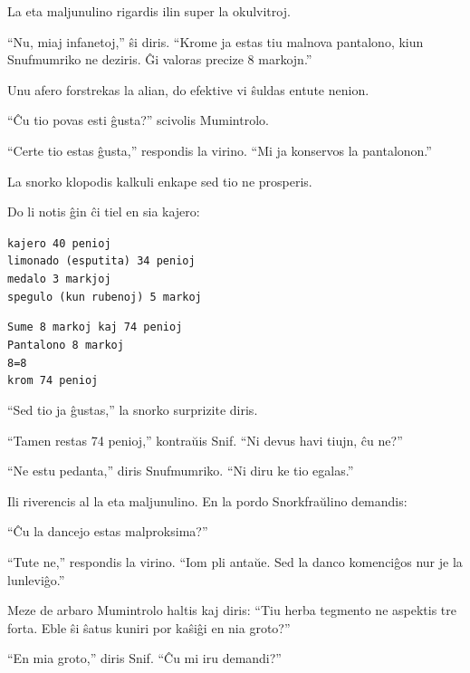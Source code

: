 La eta maljunulino rigardis ilin super la okulvitroj.

``Nu, miaj infanetoj,'' ŝi diris. ``Krome ja estas tiu malnova pantalono, kiun Snufmumriko ne deziris. Ĝi valoras precize 8 markojn.''

Unu afero forstrekas la alian, do efektive vi ŝuldas entute nenion.

``Ĉu tio povas esti ĝusta?'' scivolis Mumintrolo.

``Certe tio estas ĝusta,'' respondis la virino. ``Mi ja konservos la pantalonon.''

La snorko klopodis kalkuli enkape sed tio ne prosperis.

Do li notis ĝin ĉi tiel en sia kajero:

\begin{adjustbox}{minipage=0.5\textwidth,margin=10pt,center}\texttt{kajero	40 penioj\\
limonado (esputita)	34 penioj\\
medalo	3 markjoj\\
spegulo (kun rubenoj)	5 markoj\\}\end{adjustbox}

\begin{adjustbox}{minipage=0.5\textwidth,margin=10pt,center}\texttt{Sume 8 markoj kaj 74 penioj\\
Pantalono 8 markoj \\
8=8 \\
krom 74 penioj\\}\end{adjustbox}

``Sed tio ja ĝustas,'' la snorko surprizite diris.

``Tamen restas 74 penioj,'' kontraŭis Snif. ``Ni devus havi tiujn, ĉu ne?''

``Ne estu pedanta,'' diris Snufmumriko. ``Ni diru ke tio egalas.''

Ili riverencis al la eta maljunulino. En la pordo Snorkfraŭlino demandis:

``Ĉu la dancejo estas malproksima?''

``Tute ne,'' respondis la virino. ``Iom pli antaŭe. Sed la danco komenciĝos nur je la lunleviĝo.''

\sectionbreak

Meze de arbaro Mumintrolo haltis kaj diris: ``Tiu herba tegmento ne aspektis tre forta. Eble ŝi ŝatus kuniri por kaŝiĝi en nia groto?''

``En mia groto,'' diris Snif. ``Ĉu mi iru demandi?''

